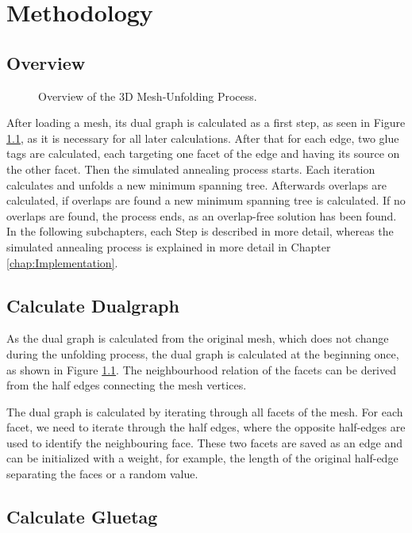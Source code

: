 \documentclass[draft,final]{vutinfth} %
\begin{document}
\chapter{Methodology}
\label{chap:methodology}

\section{Overview}

\begin{figure}

\caption{Overview of the 3D Mesh-Unfolding Process.}
\label{fig:overview}
\end{figure}

After loading a mesh, its dual graph is calculated as a first step, as seen in Figure \ref{fig:overview}, as it is necessary for all later calculations. After that for each edge, two glue tags are calculated, each targeting one facet of the edge and having its source on the other facet. Then the simulated annealing process starts. Each iteration calculates and unfolds a new minimum spanning tree. Afterwards overlaps are calculated, if overlaps are found a new minimum spanning tree is calculated. If no overlaps are found, the process ends, as an overlap-free solution has been found. In the following subchapters, each Step is described in more detail, whereas the simulated annealing process is explained in more detail in Chapter \ref{chap:Implementation}.

\section{Calculate Dualgraph}

As the dual graph is calculated from the original mesh, which does not change during the unfolding process, the dual graph is calculated at the beginning once, as shown in Figure \ref{fig:overview}. The neighbourhood relation of the facets can be derived from the half edges connecting the mesh vertices. 

The dual graph is calculated by iterating through all facets of the mesh. For each facet, we need to iterate through the half edges, where the opposite half-edges are used to identify the neighbouring face. These two facets are saved as an edge and can be initialized with a weight, for example, the length of the original half-edge separating the faces or a random value.

\section{Calculate Gluetag}
\end{document}

